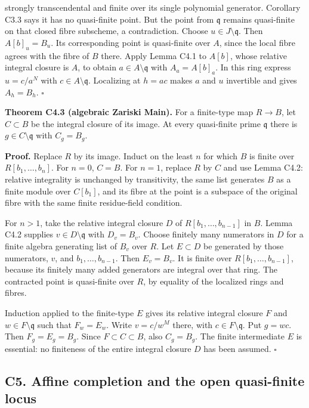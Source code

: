 \documentclass[11pt,a4paper,openany]{report}
\begin{document}
strongly transcendental and finite over its single polynomial generator. Corollary C3.3 says it has no quasi-finite point. But the point from \(\mathfrak q\) remains quasi-finite on that closed fibre subscheme, a contradiction. Choose \(u\in J\setminus\mathfrak q\). Then \(A[b]_u=B_u\). Its corresponding point is quasi-finite over \(A\), since the local fibre agrees with the fibre of \(B\) there. Apply Lemma C4.1 to \(A[b]\), whose relative integral closure is \(A\), to obtain \(a\in A\setminus\mathfrak q\) with \(A_a=A[b]_a\). In this ring express \(u=c/a^N\) with \(c\in A\setminus\mathfrak q\). Localizing at \(h=ac\) makes \(a\) and \(u\) invertible and gives \(A_h=B_h\). \(\square\)

\textbf{Theorem C4.3 (algebraic Zariski Main).} For a finite-type map \(R\to B\), let \(C\subset B\) be the integral closure of its image. At every quasi-finite prime \(\mathfrak q\) there is \(g\in C\setminus\mathfrak q\) with \(C_g=B_g\).

\textbf{Proof.} Replace \(R\) by its image. Induct on the least \(n\) for which \(B\) is finite over \(R[b_1,\ldots,b_n]\). For \(n=0\), \(C=B\). For \(n=1\), replace \(R\) by \(C\) and use Lemma C4.2: relative integrality is unchanged by transitivity, the same list generates \(B\) as a finite module over \(C[b_1]\), and its fibre at the point is a subspace of the original fibre with the same finite residue-field condition.

For \(n>1\), take the relative integral closure \(D\) of \(R[b_1,\ldots,b_{n-1}]\) in \(B\). Lemma C4.2 supplies \(v\in D\setminus\mathfrak q\) with \(D_v=B_v\). Choose finitely many numerators in \(D\) for a finite algebra generating list of \(B_v\) over \(R\). Let \(E\subset D\) be generated by those numerators, \(v\), and \(b_1,\ldots,b_{n-1}\). Then \(E_v=B_v\). It is finite over \(R[b_1,\ldots,b_{n-1}]\), because its finitely many added generators are integral over that ring. The contracted point is quasi-finite over \(R\), by equality of the localized rings and fibres.

Induction applied to the finite-type \(E\) gives its relative integral closure \(F\) and \(w\in F\setminus\mathfrak q\) such that \(F_w=E_w\). Write \(v=c/w^M\) there, with \(c\in F\setminus\mathfrak q\). Put \(g=wc\). Then \(F_g=E_g=B_g\). Since \(F\subset C\subset B\), also \(C_g=B_g\). The finite intermediate \(E\) is essential: no finiteness of the entire integral closure \(D\) has been assumed. \(\square\)

\subsection{C5. Affine completion and the open quasi-finite locus}\label{AG-RG-S04-c5.-affine-completion-and-the-open-quasi-finite-locus}
\end{document}
